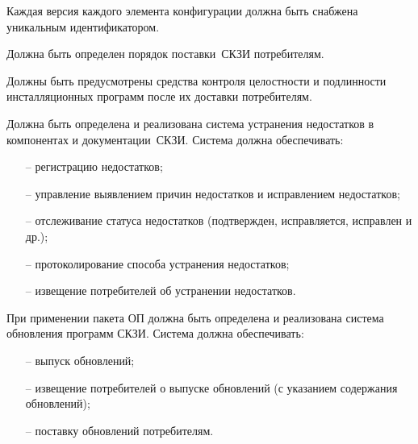\label{R.LC.CMVersion} %
Каждая версия каждого элемента конфигурации 
должна быть снабжена уникальным идентификатором. 

\label{R.LC.Delivery} %
Должна быть определен порядок поставки~СКЗИ потребителям.  

\label{R.LC.Authenticode} %
Должны быть предусмотрены средства контроля целостности и подлинности 
инсталляционных программ после их доставки потребителям. 

\label{R.LC.FlawRemediation} %
Должна быть определена и реализована система устранения недостатков в 
компонентах и документации~СКЗИ.
%
Система должна обеспечивать:
\begin{itemize}
\item[--]
регистрацию недостатков;
\item[--]
управление выявлением причин недостатков и исправлением недостатков;
\item[--]
отслеживание статуса недостатков 
(подтвержден, исправляется, исправлен и др.);
\item[--]
протоколирование способа устранения недостатков;
\item[--]
извещение потребителей об устранении недостатков.
\end{itemize}

\label{R.LC.SU} %
При применении пакета ОП должна быть определена и реализована система 
обновления программ СКЗИ. 
%
Система должна обеспечивать:
\begin{itemize}
\item[--]
выпуск обновлений;
\item[--]
извещение потребителей о выпуске обновлений (с указанием содержания 
обновлений);  
\item[--]
поставку обновлений потребителям.
\end{itemize}

